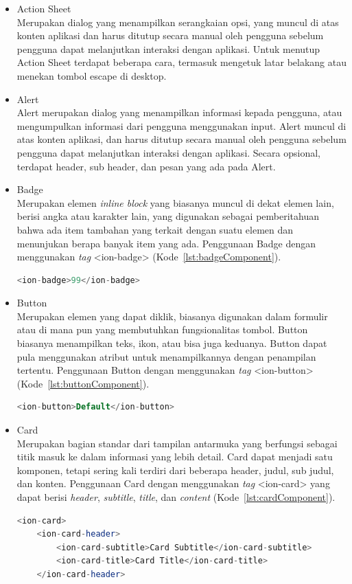 \begin{itemize}
	\item Action Sheet \\
	Merupakan dialog yang menampilkan serangkaian opsi, yang muncul di atas konten aplikasi dan harus ditutup secara manual oleh pengguna sebelum pengguna dapat melanjutkan interaksi dengan aplikasi. Untuk menutup Action Sheet terdapat beberapa cara, termasuk mengetuk latar belakang atau menekan tombol escape di desktop.

	\item Alert \\
	Alert merupakan dialog yang menampilkan informasi kepada pengguna, atau mengumpulkan informasi dari pengguna menggunakan input. Alert muncul di atas konten aplikasi, dan harus ditutup secara manual oleh pengguna sebelum pengguna dapat melanjutkan interaksi dengan aplikasi. Secara opsional, terdapat header, sub header, dan pesan yang ada pada Alert.
	\item Badge \\
	Merupakan elemen {\it inline block} yang biasanya muncul di dekat elemen lain, berisi angka atau karakter lain, yang digunakan sebagai pemberitahuan bahwa ada item tambahan yang terkait dengan suatu elemen dan menunjukan berapa banyak item yang ada. Penggunaan Badge dengan menggunakan {\it tag} <ion-badge> (Kode~\ref{lst:badgeComponent}).
	\begin{lstlisting}[language=php, label={lst:badgeComponent}, caption=Potongan Kode Program dari Badge Component]
<ion-badge>99</ion-badge>
	\end{lstlisting} 
	\item Button \\
	Merupakan elemen yang dapat diklik, biasanya digunakan dalam formulir atau di mana pun yang membutuhkan fungsionalitas tombol. Button biasanya menampilkan teks, ikon, atau bisa juga keduanya. Button dapat pula menggunakan atribut untuk menampilkannya dengan penampilan tertentu. Penggunaan Button dengan menggunakan {\it tag} <ion-button>  (Kode~\ref{lst:buttonComponent}). \newpage
	\begin{lstlisting}[language=php, label={lst:buttonComponent}, caption=Potongan Kode Program dari Button Component]
<ion-button>Default</ion-button>
	\end{lstlisting} 

	\item Card \\
	Merupakan bagian standar dari tampilan antarmuka yang berfungsi sebagai titik masuk ke dalam informasi yang lebih detail. Card dapat menjadi satu komponen, tetapi sering kali terdiri dari beberapa header, judul, sub judul, dan konten. Penggunaan Card dengan menggunakan {\it tag} <ion-card> yang dapat berisi {\it header}, {\it subtitle}, {\it title}, dan {\it content} (Kode~\ref{lst:cardComponent}).
	\begin{lstlisting}[language=php, label={lst:cardComponent}, caption=Potongan Kode Program dari Card Component]
<ion-card>
	<ion-card-header>
		<ion-card-subtitle>Card Subtitle</ion-card-subtitle>
		<ion-card-title>Card Title</ion-card-title>
	</ion-card-header>
				

\end{lstlisting}
\end{itemize}

